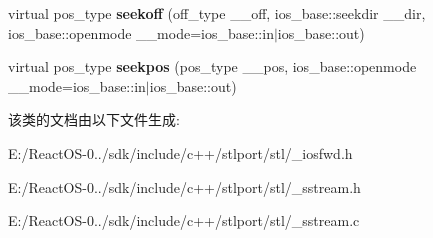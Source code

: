 \begin{DoxyCompactItemize}
\item 
\mbox{\label{classbasic__stringbuf_a367d9784a7878a917c6c05807f2ce285}} 
virtual pos\+\_\+type {\bfseries seekoff} (off\+\_\+type \+\_\+\+\_\+off, ios\+\_\+base\+::seekdir \+\_\+\+\_\+dir, ios\+\_\+base\+::openmode \+\_\+\+\_\+mode=ios\+\_\+base\+::in$\vert$ios\+\_\+base\+::out)
\item 
\mbox{\label{classbasic__stringbuf_a4173edb969cd7532fa0067116109f87b}} 
virtual pos\+\_\+type {\bfseries seekpos} (pos\+\_\+type \+\_\+\+\_\+pos, ios\+\_\+base\+::openmode \+\_\+\+\_\+mode=ios\+\_\+base\+::in$\vert$ios\+\_\+base\+::out)
\end{DoxyCompactItemize}


该类的文档由以下文件生成\+:\begin{DoxyCompactItemize}
\item 
E\+:/\+React\+O\+S-\/0../sdk/include/c++/stlport/stl/\+\_\+iosfwd.\+h\item 
E\+:/\+React\+O\+S-\/0../sdk/include/c++/stlport/stl/\+\_\+sstream.\+h\item 
E\+:/\+React\+O\+S-\/0../sdk/include/c++/stlport/stl/\+\_\+sstream.\+c\end{DoxyCompactItemize}

